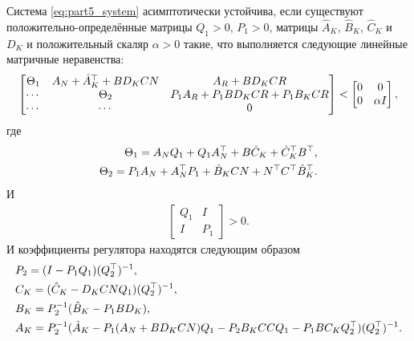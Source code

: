 \begin{theorem}
	Система \eqref{eq:part5_system} асимптотически устойчива, если существуют положительно-определённые матрицы ${Q}_1>0$, ${P}_1>0$, матрицы $\hat{{A}}_K$,  $\hat{{B}}_K$, $\hat{{C}}_K$ и $D_K$
	и положительный скаляр $\alpha>0$ такие, что выполняется следующие линейные матричные неравенства:
		\begin{align}\label{eq:part5_finalLMI}
		\begin{bmatrix}
			{\Theta}_1  & {A}_N + {\hat{A}}_K^\top +{B}{D}_K{C}{N} & {A}_R + {B}{D}_K{C}{R}\\
			\cdots & {\Theta}_2 & {P}_{1}{A}_R + {P}_{1}{B}{D}_K{C}{R}+{P}_1{B}_K{C}{R}\\
			\cdots & \cdots & 0 
		\end{bmatrix} < 
		\begin{bmatrix}
			0 & 0\\
			0 & \alpha {I}
		\end{bmatrix},
	\end{align}
	где
	\begin{align}
		{\Theta}_1 = {A}_N{Q}_{1} +{Q}_{1}{A}_N^\top + {B}{\hat{C}}_K +{\hat{C}}_K^\top{B}^\top, \\
		{\Theta}_2 = {P}_{1}{A}_N +{A}_N^\top{P}_{1}+{\hat{B}}_K{C}{N}+{N}^\top{C}^\top{\hat{B}}_K^\top.
	\end{align}
	И
	\begin{align}\label{eq: condition}
		\begin{bmatrix} 
			{Q}_{1} & I \\ 
			I & {P}_{1}
		\end{bmatrix} > 0.
	\end{align}
	И коэффициенты регулятора находятся следующим образом 
	\begin{align}
		&{P}_{2} = ({I}-{P}_{1}{Q}_{1})({Q}_{2}^\top)^{-1},\\
		&{C}_K = ({\hat{C}}_K - {D}_K {C} {N} {Q}_{1} ) ({Q}_{2}^\top)^{-1},\\
		&{B}_K = {P}_{2}^{-1}({\hat{B}}_K- {P}_{1}{B}{D}_K),\\
		&{A}_K = {P}_{2}^{-1}({\hat{A}}_K-{P}_{1}({A}_N+{B}{D}_K{C}{N}){Q}_{1} - {P}_{2}{B}_K{C}{C}{Q}_{1}-{P}_{1} {B}{C}_K{Q}_{2}^\top)({Q}_{2}^\top)^{-1}.
	\end{align}
\end{theorem}
